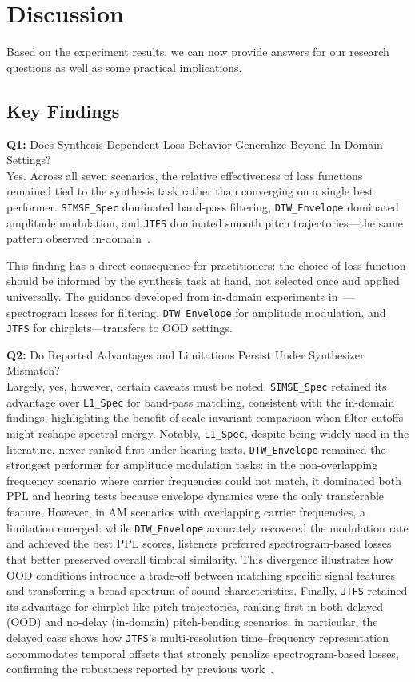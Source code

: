 \documentclass[10pt]{article} %
\newcommand{\SIMSESpec}{\texttt{SIMSE\_\allowbreak Spec}\xspace}
\newcommand{\LoneSpec}{\texttt{L1\_\allowbreak Spec}\xspace}
\newcommand{\JTFS}{\texttt{JTFS}\xspace}
\newcommand{\DTWEnv}{\texttt{DTW\_\allowbreak Envelope}\xspace}
\begin{document}
\section{Discussion}
Based on the experiment results, we can now provide answers for our research questions as well as some practical implications.

\subsection{Key Findings}
\textbf{Q1:} Does Synthesis-Dependent Loss Behavior Generalize Beyond In-Domain Settings? \\ Yes. Across all seven scenarios, the relative effectiveness of loss functions remained tied to the synthesis task rather than converging on a single best performer. \SIMSESpec{} dominated band-pass filtering, \DTWEnv{} dominated amplitude modulation, and \JTFS{} dominated smooth pitch trajectories---the same pattern observed in-domain~\cite{salimi2025evaluating}.

This finding has a direct consequence for practitioners: the choice of loss function should be informed by the synthesis task at hand, not selected once and applied universally. The guidance developed from in-domain experiments in~\cite{salimi2025evaluating}---spectrogram losses for filtering, \DTWEnv{} for amplitude modulation, and \JTFS{} for chirplets---transfers to OOD settings.

\textbf{Q2:} Do Reported Advantages and Limitations Persist Under Synthesizer Mismatch?\\
Largely, yes, however, certain caveats must be noted. \SIMSESpec{} retained its advantage over \LoneSpec{} for band-pass matching, consistent with the in-domain findings, highlighting the benefit of scale-invariant comparison when filter cutoffs might reshape spectral energy. Notably, \LoneSpec{}, despite being widely used in the literature, never ranked first under hearing tests. \DTWEnv{} remained the strongest performer for amplitude modulation tasks: in the non-overlapping frequency scenario where carrier frequencies could not match, it dominated both PPL and hearing tests because envelope dynamics were the only transferable feature. However, in AM scenarios with overlapping carrier frequencies, a limitation emerged: while \DTWEnv{} accurately recovered the modulation rate and achieved the best PPL scores, listeners preferred spectrogram-based losses that better preserved overall timbral similarity. This divergence illustrates how OOD conditions introduce a trade-off between matching specific signal features and transferring a broad spectrum of sound characteristics. Finally, \JTFS{} retained its advantage for chirplet-like pitch trajectories, ranking first in both delayed (OOD) and no-delay (in-domain) pitch-bending scenarios; in particular, the delayed case shows how \JTFS{}'s multi-resolution time–frequency representation accommodates temporal offsets that strongly penalize spectrogram-based losses, confirming the robustness reported by previous work~\cite{vahidi2023mesostructures,lostanlen2019shape}.
\end{document}
